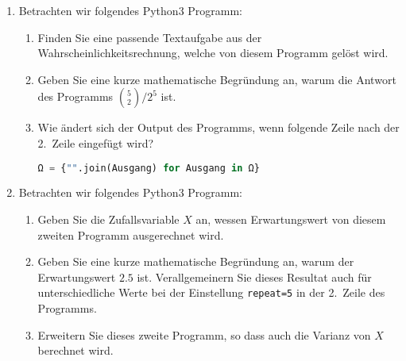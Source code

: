 \documentclass{article}
\begin{document}
\begin{enumerate}
\item Betrachten wir folgendes Python3 Programm:


\begin{enumerate}
\item Finden Sie eine passende Textaufgabe aus der Wahrscheinlichkeits\-rechnung, welche
von diesem Programm gelöst wird.
\item Geben Sie eine kurze mathematische Begründung an, warum die Antwort des Programms $\binom{5}{2}/2^5$ ist.
\item Wie ändert sich der Output des Programms, wenn folgende Zeile nach der 2.~Zeile
eingefügt wird?
\begin{lstlisting}[language=Python,numbers=none]
Ω = {"".join(Ausgang) for Ausgang in Ω}
\end{lstlisting}
\end{enumerate}

\item Betrachten wir folgendes Python3 Programm:


\begin{enumerate}
\item Geben Sie die Zufallsvariable $X$ an, wessen Erwartungswert von diesem zweiten Programm ausgerechnet wird.
\item Geben Sie eine kurze mathematische Begründung an, warum der Erwartungswert $2.5$ ist.
Verallgemeinern Sie dieses Resultat auch für unterschiedliche Werte bei der Einstellung
\texttt{repeat=5} in der 2.~Zeile des Programms.
\item Erweitern Sie dieses zweite Programm, so dass auch die Varianz von $X$ berechnet wird.
\end{enumerate}

\end{enumerate}
\end{document}
